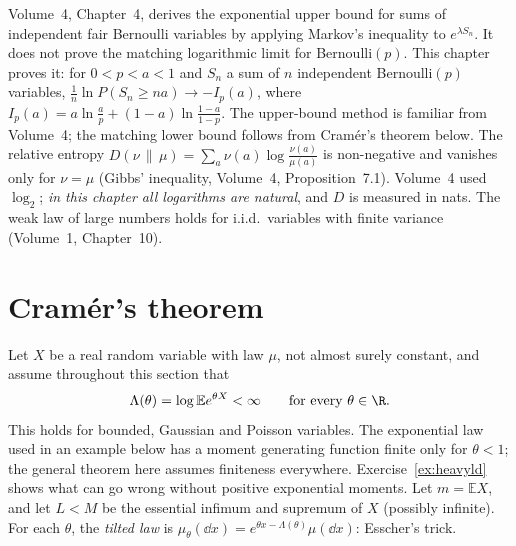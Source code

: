 \begin{reminder}
Volume~4, Chapter~4, derives the exponential upper bound for sums of independent fair Bernoulli variables by applying Markov's inequality to $e^{\lambda S_n}$. It does not prove the matching logarithmic limit for Bernoulli$(p)$. This chapter proves it: for $0<p<a<1$ and $S_n$ a sum of $n$ independent Bernoulli$(p)$ variables,
$\frac1n\ln P(S_n\ge na)\to-I_p(a)$, where $I_p(a)=a\ln\frac ap+(1-a)\ln\frac{1-a}{1-p}$. The upper-bound method is familiar from Volume~4; the matching lower bound follows from Cram\'er's theorem below. The relative entropy $D(\nu\,\|\,\mu)=\sum_a\nu(a)\log\frac{\nu(a)}{\mu(a)}$ is non-negative and vanishes only for $\nu=\mu$
(Gibbs' inequality, Volume~4, Proposition~7.1). Volume~4 used $\log_2$; \emph{in this chapter all logarithms are natural}, and $D$ is measured in nats. The weak law of large
numbers holds for i.i.d.\ variables with finite variance (Volume~1, Chapter~10).
\end{reminder}

\section{Cram\'er's theorem}

Let $X$ be a real random variable with law $\mu$, not almost surely constant, and assume throughout this section that
\begin{equation}\label{eq:cramercond}
\Lambda(\theta)=\log\mathbb Ee^{\theta X}<\infty\qquad\text{for every }\theta\in\R.
\end{equation}
This holds for bounded, Gaussian and Poisson variables. The exponential law used in an example below has a moment generating function finite only for $\theta<1$; the general theorem here assumes finiteness everywhere. Exercise~\ref{ex:heavyld} shows what can go wrong without positive exponential moments. Let $m=\mathbb EX$, and let $L<M$ be the essential
infimum and supremum of $X$ (possibly infinite). For each $\theta$, the \emph{tilted law} is $\mu_\theta(\dd x)=e^{\theta x-\Lambda(\theta)}\mu(\dd x)$: Esscher's trick.

